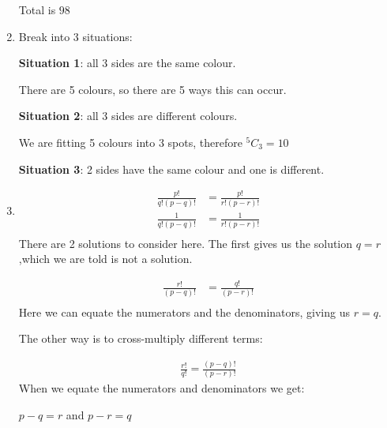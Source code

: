 \documentclass[../main.tex]{subfiles}
\begin{document}
\begin{enumerate}
    Total is \(98\)

    \item 
    Break into 3 situations: 

    \textbf{Situation 1}: all 3 sides are the same colour.

    There are 5 colours, so there are 5 ways this can occur.

    \textbf{Situation 2}: all 3 sides are different colours.

    We are fitting 5 colours into 3 spots, therefore \(^5C_3=10\)

    \textbf{Situation 3}: 2 sides have the same colour and one is different.

    

    \item 
    \begin{align*}
        \frac{p!}{q!(p-q)!}
        &=\frac{p!}{r!(p-r)!}\\
        \frac{1}{q!(p-q)!}
        &=\frac{1}{r!(p-r)!}\\
    \end{align*}
    There are 2 solutions to consider here. The first gives us the solution \(q=r \),which we are told is not a solution.

    \begin{align*}
        \frac{r!}{(p-q)!}
        &=\frac{q!}{(p-r)!}\\
    \end{align*}
    Here we can equate the numerators and the denominators, giving us \(r=q\).

    The other way is to cross-multiply different terms:

    \begin{align*}
    \frac{r!}{q!}=\frac{(p-q)!}{(p-r)!}
    \end{align*}
    When we equate the numerators and denominators we get:

    \(p-q=r\) and \(p-r=q\)


\end{enumerate}
\end{document}
